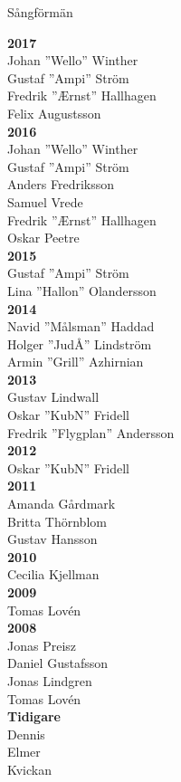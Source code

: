 \begin{flushleft}
{\Huge Sångförmän}
\end{flushleft}

{\large
\setlength{\parskip}{0.8em}
\setlength\columnsep{3em}

\begin{multicols}{2}
\textbf{2017}\\
Johan ''Wello'' Winther\\
Gustaf ''Ampi'' Ström\\
Fredrik ''Ærnst'' Hallhagen\\
Felix Augustsson\\

\textbf{2016}\\
Johan ''Wello'' Winther\\
Gustaf ''Ampi'' Ström\\
Anders Fredriksson\\
Samuel Vrede\\
Fredrik ''Ærnst'' Hallhagen\\
Oskar Peetre\\

\textbf{2015}\\
Gustaf ''Ampi'' Ström\\
Lina ''Hallon'' Olandersson\\

\textbf{2014}\\
Navid ''Målsman'' Haddad\\
Holger ''JudÅ'' Lindström\\
Armin ''Grill'' Azhirnian\\

\textbf{2013}\\
Gustav Lindwall\\
Oskar ''KubN'' Fridell\\
Fredrik ''Flygplan'' Andersson\\

\textbf{2012}\\
Oskar ''KubN'' Fridell\\

\textbf{2011}\\
Amanda Gårdmark\\
Britta Thörnblom\\
Gustav Hansson\\

\textbf{2010}\\
Cecilia Kjellman\\

\textbf{2009}\\
Tomas Lovén\\

\textbf{2008}\\
Jonas Preisz\\
Daniel Gustafsson\\
Jonas Lindgren\\
Tomas Lovén\\

\textbf{Tidigare}\\
Dennis\\
Elmer\\
Kvickan\\

\end{multicols}
}
